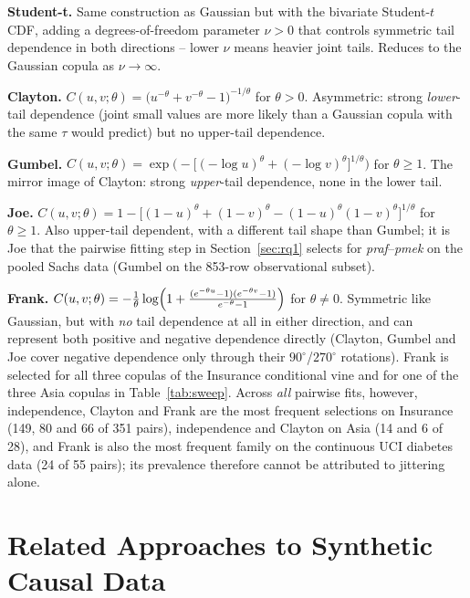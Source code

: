 \documentclass[
  english,
  class=report,
  accentcolor=2c,
  marginpar=false,
  parskip=half-,
  fontsize=11pt,
  ruledheaders=false,
  pdfa=false,
  IMRAD=false,
  thesis={type=master}
]{tudapub}
\begin{document}
\textbf{Student-t.} Same construction as Gaussian but with the
bivariate Student-$t$ CDF, adding a degrees-of-freedom parameter $\nu > 0$
that controls symmetric tail dependence in both directions -- lower $\nu$
means heavier joint tails. Reduces to the Gaussian copula as $\nu \to
\infty$.

\textbf{Clayton.} $C(u,v;\theta) = \bigl(u^{-\theta} + v^{-\theta} -
1\bigr)^{-1/\theta}$ for $\theta > 0$. Asymmetric: strong \emph{lower}-tail
dependence (joint small values are more likely than a Gaussian copula with
the same $\tau$ would predict) but no upper-tail dependence.

\textbf{Gumbel.} $C(u,v;\theta) = \exp\bigl(-\bigl[(-\log
u)^{\theta} + (-\log v)^{\theta}\bigr]^{1/\theta}\bigr)$ for $\theta \ge 1$.
The mirror image of Clayton: strong \emph{upper}-tail dependence, none in
the lower tail.

\textbf{Joe.} $C(u,v;\theta) = 1 - \bigl[(1-u)^{\theta} + (1-v)^{\theta}
- (1-u)^{\theta}(1-v)^{\theta}\bigr]^{1/\theta}$ for $\theta \ge 1$. Also
upper-tail dependent, with a different tail shape than Gumbel; it is Joe
that the pairwise fitting step in Section~\ref{sec:rq1} selects for
\emph{praf}--\emph{pmek} on the pooled Sachs data (Gumbel on the 853-row
observational subset).

\textbf{Frank.} $C(u,v;\theta) = -\frac{1}{\theta}\log\Bigl(1 +
\frac{(e^{-\theta u}-1)(e^{-\theta v}-1)}{e^{-\theta}-1}\Bigr)$ for $\theta
\ne 0$. Symmetric like Gaussian, but with \emph{no} tail dependence at all
in either direction, and can represent both positive and negative
dependence directly (Clayton, Gumbel and Joe cover negative dependence only
through their $90^\circ$/$270^\circ$ rotations). Frank is selected for all
three copulas of the Insurance conditional vine and for one of the three
Asia copulas in Table~\ref{tab:sweep}. Across \emph{all} pairwise fits,
however, independence, Clayton and Frank are the most frequent selections
on Insurance (149, 80 and 66 of 351 pairs), independence and Clayton on Asia
(14 and 6 of 28), and Frank is also the most frequent family on the
continuous UCI diabetes data (24 of 55 pairs); its prevalence therefore
cannot be attributed to jittering alone.

\section{Related Approaches to Synthetic Causal Data}
\label{sec:related-work}
\end{document}
